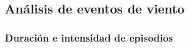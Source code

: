 \documentclass[
]{article}
\begin{document}
\subsection{Análisis de eventos de viento}\label{anuxe1lisis-de-eventos-de-viento}

\subsubsection{Duración e intensidad de episodios}\label{duraciuxf3n-e-intensidad-de-episodios}
\end{document}
